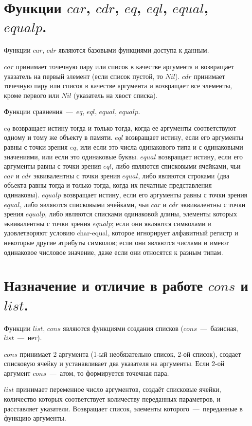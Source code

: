 \section{Функции $car$, $cdr$, $eq$, $eql$, $equal$, $equalp$.}
Функции $car$, $cdr$ являются базовыми функциями доступа к данным.

$car$ принимает точечную пару или список в качестве аргумента и возвращает указатель на первый элемент (если список пустой, то $Nil$). $cdr$ принимает точечную пару или список в качестве аргумента и возвращает все элементы, кроме первого или $Nil$ (указатель на хвост списка).

Функции сравнения~---~$eq$, $eql$, $equal$, $equalp$.

$eq$ возвращает истину тогда и только тогда, когда ее аргументы соответствуют одному и тому же объекту в памяти. $eql$ возвращает истину, если его аргументы равны с точки зрения $eq$, или если это числа одинакового типа и с одинаковыми значениями, или если это одинаковые буквы. $equal$ возвращает истину, если его аргументы равны с точки зрения $eql$,  либо являются списковыми ячейками, чьи $car$ и $cdr$ эквивалентны с точки зрения $equal$, либо являются строками (два объекта равны тогда и только тогда, когда их печатные представления одинаковы). $equalp$ возвращает истину, если его аргументы равны с точки зрения $equal$,  либо являются списковыми ячейками, чьи $car$ и $cdr$ эквивалентны с точки зрения $equalp$, либо являются списками одинаковой длины, элементы которых эквивалентны с точки зрения $equalp$; если они являются символами и удовлетворяют условию char-equal, которое игнорирует алфавитный регистр и некоторые другие атрибуты символов; если они являются числами и имеют одинаковое числовое значение, даже если они относятся к разным типам.

\section{Назначение и отличие в работе $cons$ и $list$.}
Функции $list$, $cons$ являются функциями создания списков ($cons$~---~базисная, $list$~---~нет). 

$cons$ принимает 2 аргумента (1-ый необязательно список, 2-ой список), создает списковую ячейку и устанавливает два указателя на аргументы. Если 2-ой аргумент $cons$~---~атом, то формируется точечная пара.

$list$ принимает переменное число аргументов, создаёт списковые ячейки, количество которых соответствует количеству переданных параметров, и расставляет указатели. Возвращает список, элементы которого~---~переданные в функцию аргументы.

